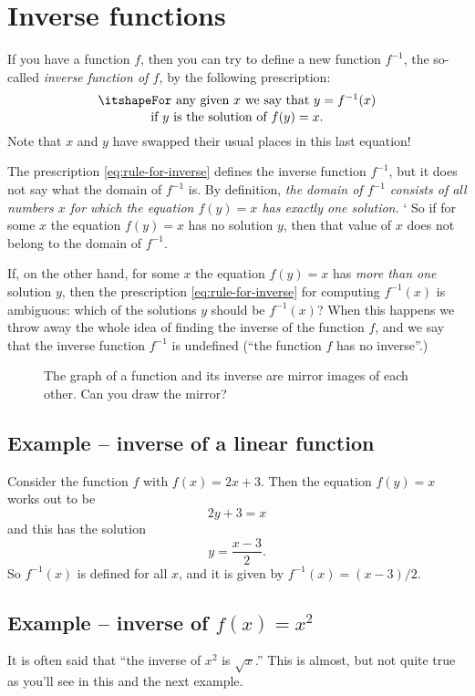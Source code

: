 \section{Inverse functions}
If you have a function $f$, then you can try to define a new function $f^{-1}$,
the so-called \emph{inverse function of $f$,} by the following prescription:
\begin{equation}\label{eq:rule-for-inverse}
  \parbox{0.7\textwidth}{\centering\itshape%
    For any given $x$ we say that $y = f^{-1}(x)$\\[1pt]
    if $y$ is the solution of $f(y)=x$.}
\end{equation}
Note that $x$ and $y$ have swapped their usual places in this last equation!

The prescription \eqref{eq:rule-for-inverse} defines the inverse function
$f^{-1}$, but it does not say what the domain of $f^{-1}$ is.  By definition,
\textit{the domain of $f^{-1}$ consists of all numbers $x$ for which the
  equation $f(y) = x$ has \emph{exactly one} solution.} ` So if for some $x$ the
equation $f(y)=x$ has no solution $y$, then that value of $x$ does not belong to
the domain of $f^{-1}$.

If, on the other hand, for some $x$ the equation $f(y)=x$ has \textit{more than
  one} solution $y$, then the prescription \eqref{eq:rule-for-inverse} for
computing $f^{-1}(x)$ is ambiguous: which of the solutions $y$ should be
$f^{-1}(x)$?  When this happens we throw away the whole idea of finding the
inverse of the function $f$, and we say that the inverse function $f^{-1}$ is
undefined (``the function $f$ has no inverse''.)


\begin{figure}[b]
  \centering 
  \caption{The graph of a function and its inverse are mirror images of each
    other.  Can you draw the mirror?}
  \label{fig:function-with-inverse}
\end{figure}


\subsection{Example -- inverse of a linear function}
Consider the function $f$ with $f(x)=2x+3$.  Then the equation $f(y) =
x$ works out to be
\[
2y+3=x
\]
and this has the solution
\[
y=\frac{x-3}2.
\]
So $f^{-1}(x)$ is defined for all $x$, and it is given by $f^{-1}(x) =
(x-3)/2$.

\subsection{Example -- inverse of $f(x) = x^2$}
It is often said that ``the inverse of $x^2$ is $\sqrt{x}$.{}''  This is
almost, but not quite true as you'll see in this and the next example.

